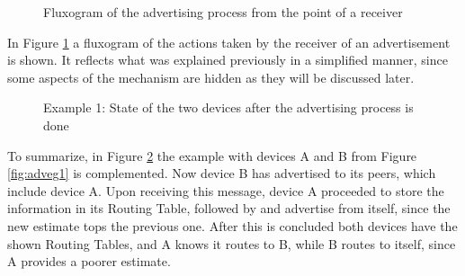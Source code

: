 \begin{figure}[ht]
   \noindent{}
	\caption{\label{fig:recvadvflux} Fluxogram of the advertising process from the point of a receiver}
\end{figure}

In Figure \ref{fig:recvadvflux} a fluxogram of the actions taken by the receiver of an advertisement is shown. It reflects what was explained previously in a simplified manner, since some aspects of the mechanism are hidden as they will be discussed later.

\begin{figure}[ht]
   \noindent{}
	\caption{\label{fig:adveg2} Example 1: State of the two devices after the advertising process is done} 
\end{figure}

To summarize, in Figure \ref{fig:adveg2} the example with devices A and B from Figure \ref{fig:adveg1} is complemented. Now device B has advertised to its peers, which include device A. Upon receiving this message, device A proceeded to store the information in its Routing Table, followed by and advertise from itself, since the new estimate tops the previous one. After this is concluded both devices have the shown Routing Tables, and A knows it routes to B, while B routes to itself, since A provides a poorer estimate.

